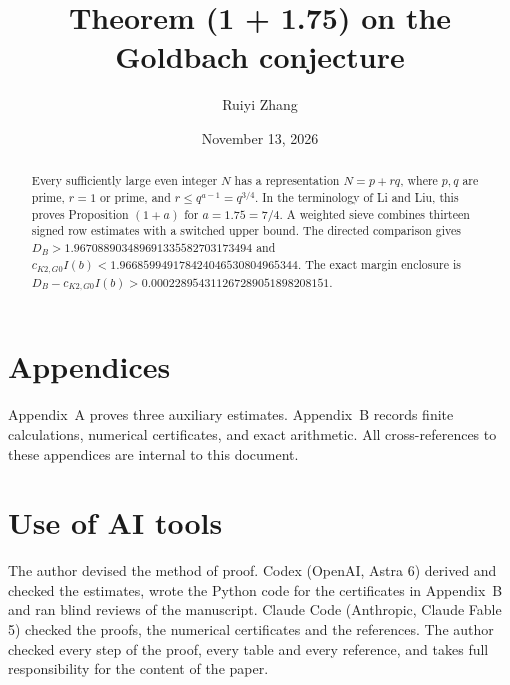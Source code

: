 \documentclass{amsart}
\newcommand{\GoldbachTitlePhrase}{1 + 1.75}
\theoremstyle{remark}
\theoremstyle{plain}
\numberwithin{equation}{section}
\numberwithin{table}{section}
\begin{document}
\title{Theorem (\GoldbachTitlePhrase) on the Goldbach conjecture}
\author{Ruiyi Zhang}
\address{Independent Researcher, Columbia, Maryland, USA}
\date{November 13, 2026}

\begin{abstract}
Every sufficiently large even integer $N$ has a representation
$N=p+rq$, where $p,q$ are prime, $r=1$ or prime, and
$r\le q^{a-1}=q^{3/4}$. In the terminology of Li and Liu, this proves
Proposition $(1+a)$ for $a=1.75=7/4$. A weighted sieve combines thirteen signed row estimates with
a switched upper bound. The directed comparison gives
$D_B>1.967088903489691335582703173494$ and
$c_{K2,G0}I(b)<1.966859949178424046530804965344$. The exact margin
enclosure is $D_B-c_{K2,G0}I(b)>0.000228954311267289051898208151$.
\end{abstract}

\maketitle
\raggedbottom










\section*{Appendices}
Appendix~A proves three auxiliary estimates. Appendix~B records finite
calculations, numerical certificates, and exact arithmetic. All cross-references
to these appendices are internal to this document.
\appendix



\section*{Use of AI tools}

The author devised the method of proof. Codex (OpenAI, Astra 6) derived and
checked the estimates, wrote the Python code for the certificates in
Appendix~B and ran blind reviews of the manuscript. Claude Code (Anthropic,
Claude Fable 5) checked the proofs, the numerical certificates and the
references. The author checked every step of the proof, every table and every
reference, and takes full responsibility for the content of the paper.
\end{document}
